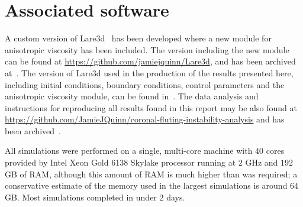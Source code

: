 \documentclass[fleqn,usenatbib]{mnras}
\begin{document}



\appendix

\section{Associated software}

A custom version of Lare3d~\citep{arberStaggeredGridLagrangian2001} has been
developed where a new module for anisotropic viscosity has been included. The
version including the new module can be found at
\url{https://github.com/jamiejquinn/Lare3d}, and has been archived
at~\citep{keith_bennett_2020_4155546}. The version of Lare3d used in the
production of the results presented here, including initial conditions,
boundary conditions, control parameters and the anisotropic viscosity module,
can be found in~\citet{keith_bennett_2020_4155625}. The data analysis and
instructions for reproducing all results found in this report may be also found
at \url{https://github.com/JamieJQuinn/coronal-fluting-instability-analysis}
and has been
archived~\citep{quinnJamieJQuinnCoronalflutinginstabilityanalysis2021}.

All simulations were performed on a single, multi-core machine with $40$ cores
provided by Intel Xeon Gold 6138 Skylake processor running at $2$ GHz and $192$
GB of RAM, although this amount of RAM is much higher than was required;
a conservative estimate of the memory used in the largest simulations is around
$64$ GB. Most simulations completed in under $2$ days.

\bsp	%
\label{lastpage}
\end{document}
